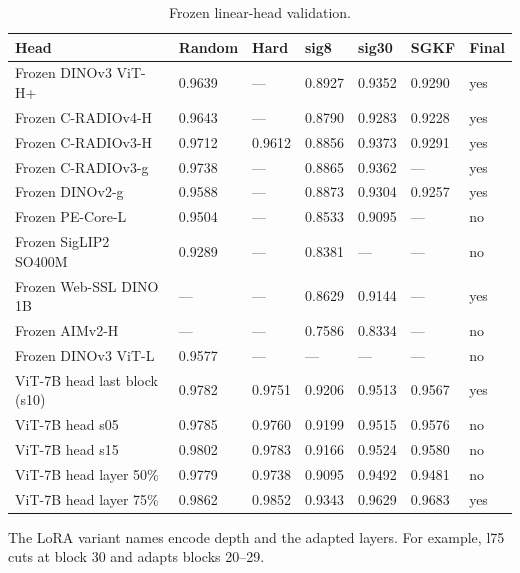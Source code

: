 \documentclass[../main.tex]{subfiles}
\begin{document}
\begin{table}[H]\centering\small
\begin{tabular}{@{}L{.31\linewidth}L{.09\linewidth}L{.09\linewidth}L{.09\linewidth}L{.09\linewidth}L{.09\linewidth}L{.07\linewidth}@{}}
\toprule
\textbf{Head} & \textbf{Random} & \textbf{Hard} & \textbf{sig8} & \textbf{sig30} & \textbf{SGKF} & \textbf{Final} \\
\midrule
Frozen DINOv3 ViT-H+ & 0.9639 & --- & 0.8927 & 0.9352 & 0.9290 & yes \\
Frozen C-RADIOv4-H & 0.9643 & --- & 0.8790 & 0.9283 & 0.9228 & yes \\
Frozen C-RADIOv3-H & 0.9712 & 0.9612 & 0.8856 & 0.9373 & 0.9291 & yes \\
Frozen C-RADIOv3-g & 0.9738 & --- & 0.8865 & 0.9362 & --- & yes \\
Frozen DINOv2-g & 0.9588 & --- & 0.8873 & 0.9304 & 0.9257 & yes \\
Frozen PE-Core-L & 0.9504 & --- & 0.8533 & 0.9095 & --- & no \\
Frozen SigLIP2 SO400M & 0.9289 & --- & 0.8381 & --- & --- & no \\
Frozen Web-SSL DINO 1B & --- & --- & 0.8629 & 0.9144 & --- & yes \\
Frozen AIMv2-H & --- & --- & 0.7586 & 0.8334 & --- & no \\
Frozen DINOv3 ViT-L & 0.9577 & --- & --- & --- & --- & no \\
ViT-7B head last block (s10) & 0.9782 & 0.9751 & 0.9206 & 0.9513 & 0.9567 & yes \\
ViT-7B head s05 & 0.9785 & 0.9760 & 0.9199 & 0.9515 & 0.9576 & no \\
ViT-7B head s15 & 0.9802 & 0.9783 & 0.9166 & 0.9524 & 0.9580 & no \\
ViT-7B head layer 50\% & 0.9779 & 0.9738 & 0.9095 & 0.9492 & 0.9481 & no \\
ViT-7B head layer 75\% & 0.9862 & 0.9852 & 0.9343 & 0.9629 & 0.9683 & yes \\
\bottomrule
\end{tabular}
\caption{Frozen linear-head validation.}\label{tab:t4-backbones-fr}
\end{table}

The LoRA variant names encode depth and the adapted layers. For example, l75 cuts at block 30 and adapts blocks 20--29.
\end{document}
